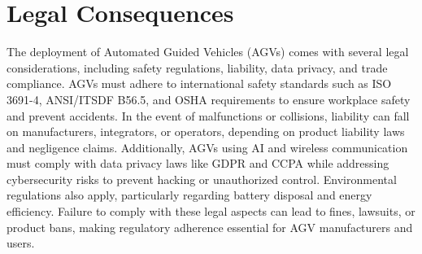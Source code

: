 \documentclass[../../main]{subfiles}
\begin{document}
\section{Legal Consequences}

The deployment of Automated Guided Vehicles (AGVs) comes with several legal considerations, including safety regulations, 
liability, data privacy, and trade compliance. AGVs must adhere to international safety standards such as ISO 3691-4, 
ANSI/ITSDF B56.5\cite{ANSIITSDFB56.5}, and OSHA requirements\cite{OSHArequirements} to ensure workplace safety and prevent accidents. In the event of malfunctions or collisions, 
liability can fall on manufacturers, integrators, or operators, depending on product liability laws and negligence claims.
Additionally, AGVs using AI and wireless communication must comply with data privacy laws like GDPR\cite{GDPR} and CCPA \cite{CCPA} while addressing
cybersecurity risks to prevent hacking or unauthorized control. Environmental regulations also apply, particularly regarding 
battery disposal and energy efficiency. Failure to comply with these legal aspects can lead to fines, lawsuits, or product bans, 
making regulatory adherence essential for AGV manufacturers and users.
\end{document}
